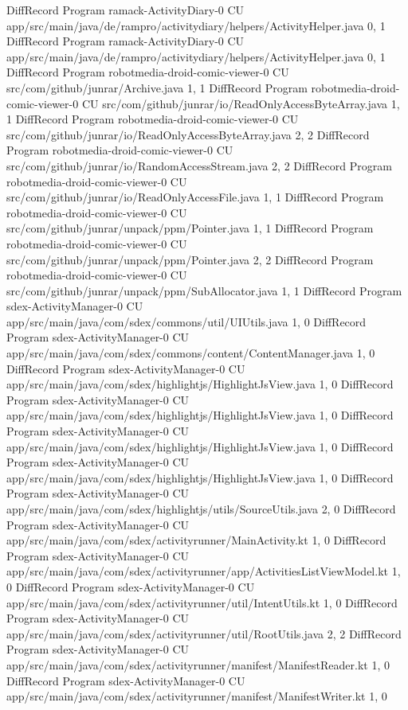 DiffRecord Program ramack-ActivityDiary-0 CU app/src/main/java/de/rampro/activitydiary/helpers/ActivityHelper.java  {0, 1}
DiffRecord Program ramack-ActivityDiary-0 CU app/src/main/java/de/rampro/activitydiary/helpers/ActivityHelper.java  {0, 1}
DiffRecord Program robotmedia-droid-comic-viewer-0 CU src/com/github/junrar/Archive.java  {1, 1}
DiffRecord Program robotmedia-droid-comic-viewer-0 CU src/com/github/junrar/io/ReadOnlyAccessByteArray.java  {1, 1}
DiffRecord Program robotmedia-droid-comic-viewer-0 CU src/com/github/junrar/io/ReadOnlyAccessByteArray.java  {2, 2}
DiffRecord Program robotmedia-droid-comic-viewer-0 CU src/com/github/junrar/io/RandomAccessStream.java  {2, 2}
DiffRecord Program robotmedia-droid-comic-viewer-0 CU src/com/github/junrar/io/ReadOnlyAccessFile.java  {1, 1}
DiffRecord Program robotmedia-droid-comic-viewer-0 CU src/com/github/junrar/unpack/ppm/Pointer.java  {1, 1}
DiffRecord Program robotmedia-droid-comic-viewer-0 CU src/com/github/junrar/unpack/ppm/Pointer.java  {2, 2}
DiffRecord Program robotmedia-droid-comic-viewer-0 CU src/com/github/junrar/unpack/ppm/SubAllocator.java  {1, 1}
DiffRecord Program sdex-ActivityManager-0 CU app/src/main/java/com/sdex/commons/util/UIUtils.java  {1, 0}
DiffRecord Program sdex-ActivityManager-0 CU app/src/main/java/com/sdex/commons/content/ContentManager.java  {1, 0}
DiffRecord Program sdex-ActivityManager-0 CU app/src/main/java/com/sdex/highlightjs/HighlightJsView.java  {1, 0}
DiffRecord Program sdex-ActivityManager-0 CU app/src/main/java/com/sdex/highlightjs/HighlightJsView.java  {1, 0}
DiffRecord Program sdex-ActivityManager-0 CU app/src/main/java/com/sdex/highlightjs/HighlightJsView.java  {1, 0}
DiffRecord Program sdex-ActivityManager-0 CU app/src/main/java/com/sdex/highlightjs/HighlightJsView.java  {1, 0}
DiffRecord Program sdex-ActivityManager-0 CU app/src/main/java/com/sdex/highlightjs/utils/SourceUtils.java  {2, 0}
DiffRecord Program sdex-ActivityManager-0 CU app/src/main/java/com/sdex/activityrunner/MainActivity.kt  {1, 0}
DiffRecord Program sdex-ActivityManager-0 CU app/src/main/java/com/sdex/activityrunner/app/ActivitiesListViewModel.kt  {1, 0}
DiffRecord Program sdex-ActivityManager-0 CU app/src/main/java/com/sdex/activityrunner/util/IntentUtils.kt  {1, 0}
DiffRecord Program sdex-ActivityManager-0 CU app/src/main/java/com/sdex/activityrunner/util/RootUtils.java  {2, 2}
DiffRecord Program sdex-ActivityManager-0 CU app/src/main/java/com/sdex/activityrunner/manifest/ManifestReader.kt  {1, 0}
DiffRecord Program sdex-ActivityManager-0 CU app/src/main/java/com/sdex/activityrunner/manifest/ManifestWriter.kt  {1, 0}
